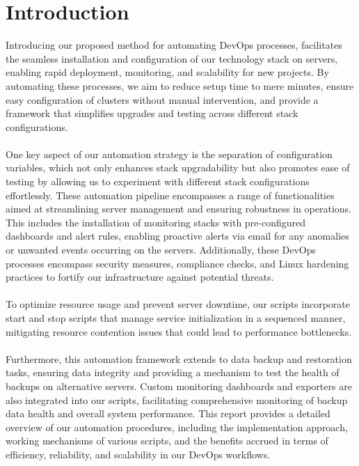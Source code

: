 \documentclass[12pt,a4paper,oneside]{report}
\begin{document}
\newpage
{}
\chapter{Introduction}

\hspace{1cm} Introducing our proposed method for automating DevOps processes,  facilitates the seamless installation and configuration of our technology stack on servers, enabling rapid deployment, monitoring, and scalability for new projects. By automating these processes, we aim to reduce setup time to mere minutes, ensure easy configuration of clusters without manual intervention, and provide a framework that simplifies upgrades and testing across different stack configurations.   \\
\\
\hspace{1cm}    One key aspect of our automation strategy is the separation of configuration variables, which not only enhances stack upgradability but also promotes ease of testing by allowing us to experiment with different stack configurations effortlessly. These automation pipeline encompasses a range of functionalities aimed at streamlining server management and ensuring robustness in operations. This includes the installation of monitoring stacks with pre-configured dashboards and alert rules, enabling proactive alerts via email for any anomalies or unwanted events occurring on the servers. Additionally, these DevOps processes encompass security measures, compliance checks, and Linux hardening practices to fortify our infrastructure against potential threats.\\
\\
\hspace{1cm}  To optimize resource usage and prevent server downtime, our scripts incorporate start and stop scripts that manage service initialization in a sequenced manner, mitigating resource contention issues that could lead to performance bottlenecks.\\
\\
\hspace{1cm}Furthermore, this automation framework extends to data backup and restoration tasks, ensuring data integrity and providing a mechanism to test the health of backups on alternative servers. Custom monitoring dashboards and exporters are also integrated into our scripts, facilitating comprehensive monitoring of backup data health and overall system performance. This report provides a detailed overview of our automation procedures, including the implementation approach, working mechanisms of various scripts, and the benefits accrued in terms of efficiency, reliability, and scalability in our DevOps workflows.\\
\end{document}
